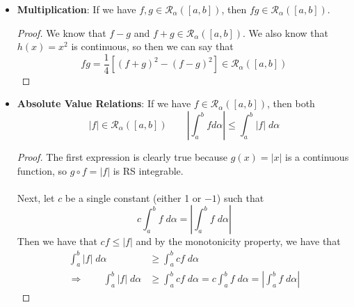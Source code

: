 \documentclass[12pt]{article}
\theoremstyle{plain}
\theoremstyle{definition}
\theoremstyle{remark}
\begin{document}
\begin{itemize}
\begin{proof}
\begin{align*}
                \Delta\alpha_i &\leq    
                \sum_{i\in B} \left[M_i(f) - m_i(f) \right]
                \Delta\alpha_i \leq \varepsilon\cdot\delta \\
                &\Rightarrow \qquad \sum_{i\in B} \Delta\alpha_i
                \leq \frac{\epsilon}{2K}
            \end{align*}
            Substituting this result back into Equation    
            \ref{final}, we see that we must have
            \begin{align*}
                U_\alpha(g\circ f,P) - L_\alpha(g\circ f,P)
                &\leq \frac{\varepsilon}{2[\alpha(b)-\alpha(a)}    
                    [\alpha(b)-\alpha(a)]
                    + K\frac{\varepsilon}{2K} \\
                    &\leq \frac{\varepsilon}{2} + 
                        \frac{\varepsilon}{2} = \varepsilon
            \end{align*}
            Thus, we have that $g\circ 
            f\in\mathscr{R}_\alpha([a,b])$.
        \end{proof}
    \item \textbf{Multiplication}: If we have 
        $f,g\in\mathscr{R}_\alpha([a,b])$, then 
        $fg\in\mathscr{R}_\alpha([a,b])$.
        \begin{proof}
            We know that $f - g$ and $f+g \in
            \mathscr{R}_\alpha([a,b])$. We also know that 
            $h(x) = x^2$ is continuous, so then we can say that
            \[ fg = \frac{1}{4} \left[(f+g)^2 - (f-g)^2 \right]
                \in\mathscr{R}_\alpha([a,b])
                \]
        \end{proof}
    \item \textbf{Absolute Value Relations}: If we have
        $f \in \mathscr{R}_\alpha([a,b])$, then both
        \[ |f| \in \mathscr{R}_\alpha([a,b]) \qquad
            \left\lvert\int^b_a f d\alpha \right\rvert
            \leq \int^b_a |f| \; d\alpha \]
        \begin{proof}
            The first expression is clearly true because $g(x)=|x|$
            is a continuous function, so $g\circ f = |f|$ is
            RS integrable.
            \\
            \\
            Next, let $c$ be a single constant (either 1 or 
            $-1$) such that 
                \[ c\int^b_a f\; d\alpha = \left\lvert 
                \int^b_a f\;d\alpha \right\rvert \]
            Then we have that $cf \leq |f|$ and by the monotonicity
            property, we have that
            \begin{align*}
                \int^b_a |f| \; d\alpha &\geq 
                    \int^b_a cf \; d\alpha \\
                \Rightarrow \qquad 
                \int^b_a |f| \; d\alpha &\geq
                    \int^b_a cf \; d\alpha =
                    c \int^b_a f \; d\alpha = 
                    \left\lvert
                    \int^b_a f \; d\alpha \right\rvert 
            \end{align*}
        \end{proof}
        

\end{itemize}
\end{document}
